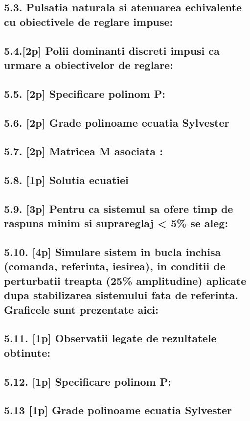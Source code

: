 \documentclass[12pt,english]{article}
\begin{document}
\subsection {5.3. Pulsatia naturala si atenuarea echivalente cu obiectivele de reglare impuse: }
\subsection {5.4.[2p] Polii dominanti discreti impusi ca urmare a obiectivelor de reglare: }
\subsection {5.5. [2p] Specificare polinom P: }
\subsection {5.6. [2p] Grade polinoame ecuatia Sylvester }
\subsection {5.7. [2p]  Matricea M asociata : }
\subsection {5.8. [1p] Solutia ecuatiei}
\subsection {5.9. [3p] Pentru ca sistemul sa ofere timp de raspuns minim si suprareglaj < 5\% se aleg: }
\subsection {5.10. [4p]  Simulare sistem in bucla inchisa (comanda, referinta, iesirea), in conditii de perturbatii treapta (25\% amplitudine) aplicate dupa stabilizarea sistemului fata de referinta. Graficele sunt prezentate aici: }
\subsection {5.11. [1p] Observatii legate de rezultatele obtinute: }
\subsection {5.12. [1p] Specificare polinom P: }
\subsection {5.13 [1p] Grade polinoame ecuatia Sylvester }
\end{document}
